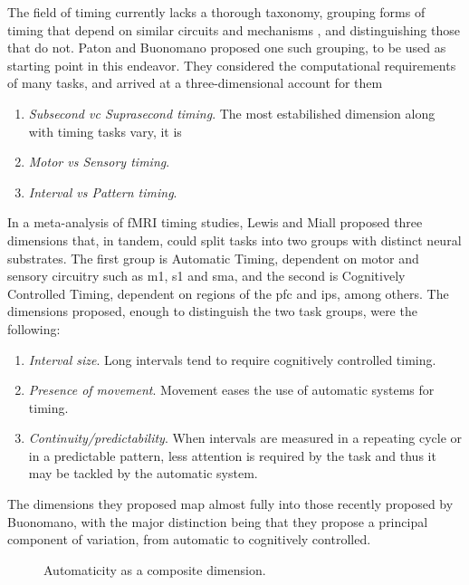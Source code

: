         The field of timing currently lacks a thorough taxonomy, grouping forms of timing that depend on similar circuits and mechanisms \cite{}, and distinguishing those that do not. Paton and Buonomano \cite{paton2018neural} proposed one such grouping, to be used as starting point in this endeavor. They considered the computational requirements of many tasks, and arrived at a three-dimensional account for them
        \begin{enumerate}
            \item \textit{Subsecond vc Suprasecond timing}. The most estabilished dimension along with timing tasks vary, it is
            \item \textit{Motor vs Sensory timing}.
            \item \textit{Interval vs Pattern timing}.
        \end{enumerate}
        
       
        In a meta-analysis of fMRI timing studies, Lewis and Miall \cite{lewis2003distinct} proposed three dimensions that, in tandem, could split tasks into two groups with distinct neural substrates. The first group is Automatic Timing, dependent on motor and sensory circuitry such as \ac{m1}, \ac{s1} and \ac{sma}, and the second is Cognitively Controlled Timing, dependent on regions of the \ac{pfc} and \ac{ips}, among others. The dimensions proposed, enough to distinguish the two task groups, were the following:
        \begin{enumerate}
            \item \textit{Interval size}. Long intervals tend to require cognitively controlled timing.
            \item \textit{Presence of movement}. Movement eases the use of automatic systems for timing.
            \item \textit{Continuity/predictability}. When intervals are measured in a repeating cycle or in a predictable pattern, less attention is required                                           by the task and thus it may be tackled by the automatic system.
        \end{enumerate}
        The dimensions they proposed map almost fully into those recently proposed by Buonomano, with the major distinction being that they propose a principal component of variation, from automatic to cognitively controlled. 
        
        \begin{figure}
            \centering
            \caption{Automaticity as a composite dimension.}
            \label{fig:automaticity}
        \end{figure}
        
